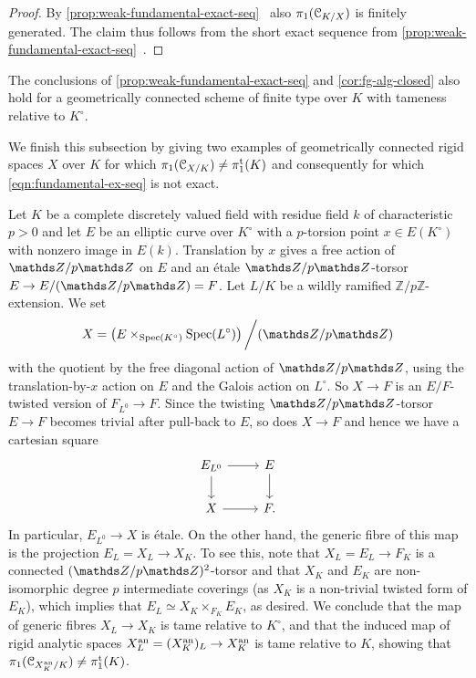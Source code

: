 \begin{proof}
By \cref{prop:weak-fundamental-exact-seq}~ also 
$\pi_1({\mathcal C}_{K/X})$ is finitely generated. The claim thus follows from the short exact sequence from
\cref{prop:weak-fundamental-exact-seq}~.
\end{proof}

\begin{rmk}
    The conclusions of \cref{prop:weak-fundamental-exact-seq} and \cref{cor:fg-alg-closed} also hold for a geometrically connected scheme of finite type over $K$ with tameness relative to $K^\circ$.
\end{rmk}

We finish this subsection by giving two examples of geometrically connected rigid spaces $X$ over $K$ for which $\pi_1({\mathcal C}_{X/K})\neq \pi_1^{\mathrm{t}}(K)$ and consequently for which \eqref{eqn:fundamental-ex-seq} is not exact. 

\begin{ex} \label{ex:Raynaud inspired example}
    Let $K$ be a complete discretely valued field with residue field $k$ of characteristic $p>0$ and let $E$ be an elliptic curve over $K^\circ$ with a $p$-torsion point $x\in E(K^\circ)$ with nonzero image in $E(k)$. Translation by $x$ gives a free action of $\bZ/p\bZ$ on $E$ and an \'etale $\bZ/p\bZ$-torsor $E\to E/(\bZ/p\bZ)=F$.   
    Let $L/K$ be a wildly ramified $\mathbb{Z}/p\mathbb{Z}$-extension. We set
    \[
        X = \left(E\times_{\Spec(K^\circ)} \Spec(L^\circ)\right)\bigg/ (\bZ/p\bZ)
    \]
    with the quotient by the free diagonal action of $\bZ/p\bZ$, using the translation-by-$x$ action on $E$ and the Galois action on $L^\circ$. 
    So $X \to F$ is an $E/F$-twisted version of $F_{L^0} \to F$. Since the twisting $\bZ/p\bZ$-torsor $E\to F$ becomes trivial after pull-back to $E$, so does $X \to F$ and hence we have a cartesian square
    \[
        \begin{tikzcd}
            E_{L^0} \ar[r] \ar[d] & E \ar[d] \\
            X \ar[r] & F.
        \end{tikzcd}
    \]
    In particular, $E_{L^0}\to X$ is \'etale. On the other hand, the generic fibre of this map is the projection $E_L = X_L\to X_K$. To see this, note that $X_L=E_L\to F_K$ is a connected $(\bZ/p\bZ)^2$-torsor and that $X_K$ and $E_K$ are non-isomorphic degree $p$ intermediate coverings (as $X_K$ is a non-trivial twisted form of $E_K$), which implies that $E_L \simeq X_K\times_{F_K} E_K$, as desired.
    We conclude that the map of generic fibres $X_L\to X_K$ is tame relative to $K^\circ$, and that the induced map of rigid analytic spaces $X_L^{\rm an}=(X_K^{\rm an})_L\to X_K^{\rm an}$ is tame relative to $K$, showing that $\pi_1({\mathcal C}_{X_K^{\rm an}/K})\neq\pi_1^{\mathrm{t}}(K)$.
\end{ex}


